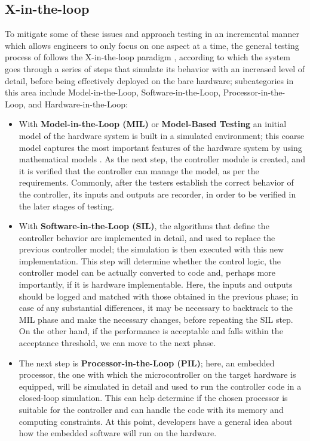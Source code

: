 \subsection{X-in-the-loop}
To mitigate some of these issues and approach \es testing in an incremental manner which allows engineers to only focus on one aspect at a time, the general testing process of \ess follows the X-in-the-loop paradigm \cite{DBLP:journals/software/GarousiFKY18}, according to which the system goes through a series of steps that simulate its behavior with an increased level of detail, before being effectively deployed on the bare hardware; subcategories in this area include Model-in-the-Loop, Software-in-the-Loop, Processor-in-the-Loop, and Hardware-in-the-Loop:
\begin{itemize}
    \item With \textbf{Model-in-the-Loop (MIL)} or \textbf{Model-Based Testing} an initial model of the hardware system is built in a simulated environment; this coarse model captures the most important features of the hardware system by using mathematical models \cite{XLoop}. As the next step, the controller module is created, and it is verified that the controller can manage the model, as per the requirements. Commonly, after the testers establish the correct behavior of the controller, its inputs and outputs are recorder, in order to be verified in the later stages of testing.
    \item With \textbf{Software-in-the-Loop (SIL)}, the algorithms that define the controller behavior are implemented in detail, and used to replace the previous controller model; the simulation is then executed with this new implementation. This step will determine whether the control logic, \ie the controller model can be actually converted to code and, perhaps more importantly, if it is hardware implementable. Here, the inputs and outputs should be logged and matched with those obtained in the previous phase; in case of any substantial differences, it may be necessary to backtrack to the MIL phase and make the necessary changes, before repeating the SIL step. On the other hand, if the performance is acceptable and falls within the acceptance threshold, we can move to the next phase.
    \item The next step is \textbf{Processor-in-the-Loop (PIL)}; here, an embedded processor, the one with which the microcontroller on the target hardware is equipped, will be simulated in detail and used to run the controller code in a closed-loop simulation. This can help determine if the chosen processor is suitable for the controller and can handle the code with its memory and computing constraints. At this point, developers have a general idea about how the embedded software will run on the hardware.

\end{itemize}
